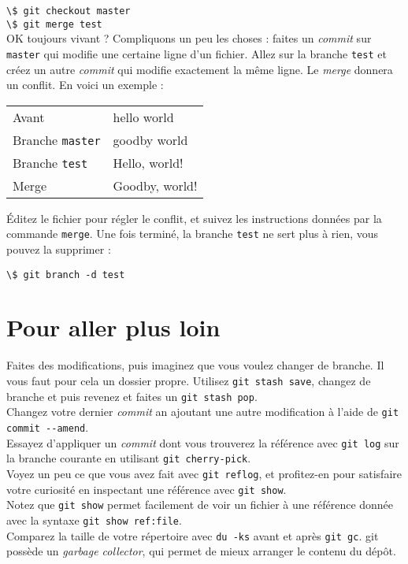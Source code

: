 \documentclass[a4paper,11pt]{article}
\newcommand{\code}[1]{\lstinline{#1}}
\newcommand{\shell}[1]{\hspace*{1cm}\lstinline{\$ #1}\\}
\begin{document}
\shell{git checkout master}
\shell{git merge test}

OK toujours vivant ? Compliquons un peu les choses : faites un \textit{commit} sur \code{master} qui modifie une certaine ligne d'un fichier. Allez sur la branche \code{test} et créez un autre \textit{commit} qui modifie exactement la même ligne. Le \textit{merge} donnera un conflit. En voici un exemple :

\bigskip
\begin{tabular}{ll}
  Avant & hello world \\
  Branche \code{master} & goodby world\\
  Branche \code{test} & Hello, world!\\
  Merge & Goodby, world!
\end{tabular}
\bigskip

Éditez le fichier pour régler le conflit, et suivez les instructions données par la commande \code{merge}. Une fois terminé, la branche \code{test} ne sert plus à rien, vous pouvez la supprimer :

\shell{git branch -d test}

\section{Pour aller plus loin}

Faites des modifications, puis imaginez que vous voulez changer de branche. Il vous faut pour cela un dossier propre. Utilisez \code{git stash save}, changez de branche et puis revenez et faites un \code{git stash pop}. \\

Changez votre dernier \emph{commit} an ajoutant une autre modification à l'aide de \code{git commit --amend}. \\

Essayez d'appliquer un \emph{commit} dont vous trouverez la référence avec \code{git log} sur la branche courante en utilisant \code{git cherry-pick}. \\

Voyez un peu ce que vous avez fait avec \code{git reflog}, et profitez-en pour satisfaire votre curiosité en inspectant une référence avec \code{git show}. \\

Notez que \code{git show} permet facilement de voir un fichier à une référence donnée avec la syntaxe \code{git show ref:file}. \\

Comparez la taille de votre répertoire avec \code{du -ks} avant et après \code{git gc}. git possède un \emph{garbage collector}, qui permet de mieux arranger le contenu du dépôt. \\
\end{document}
